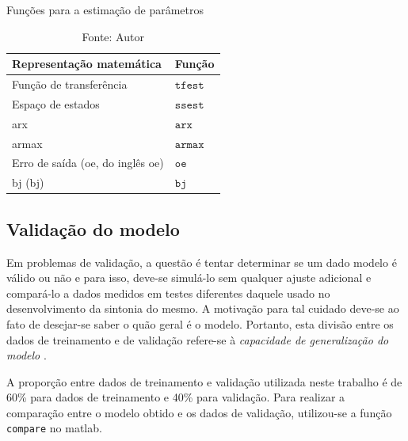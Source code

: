 \begin{table}[h]
	\centering
	\caption{Funções para a estimação de parâmetros}
	\label{tab:param_est_functions}
	\begin{tabular}{ll} \toprule
		{Representação matemática}		                                & {Função}				                    \\ \midrule
		Função de transferência		                                    & $\mathtt{tfest}$                          \\
		Espaço de estados   		                                    & $\mathtt{ssest}$                          \\
		\acrshort{arx}		                                            & $\mathtt{arx}$                            \\
		\acrshort{armax}		                                        & $\mathtt{armax}$                          \\
		Erro de saída (\acrshort{oe}, do inglês \acrlong{oe})		    & $\mathtt{oe}$                             \\
		\acrlong{bj} (\acrshort{bj})             	                    & $\mathtt{bj}$                             \\ \bottomrule
	\end{tabular}
	\caption*{Fonte: Autor}
\end{table}

\subsection{Validação do modelo}
\label{subsec:validacao_do_modelo}

Em problemas de validação, a questão é tentar determinar se um dado modelo é válido ou não e para isso,
deve-se simulá-lo sem qualquer ajuste adicional e compará-lo a dados medidos em testes diferentes daquele
usado no desenvolvimento da sintonia do mesmo. A motivação para tal cuidado deve-se ao fato de desejar-se
saber o quão geral é o modelo. Portanto, esta divisão entre os dados de treinamento e de validação refere-se
à \textit{capacidade de generalização do modelo} \cite{Aguirre2015}.

A proporção entre dados de treinamento e validação utilizada neste trabalho é de 60\% para dados de treinamento
e 40\% para validação. Para realizar a comparação entre o modelo obtido e os dados de validação, utilizou-se
a função \texttt{compare} no \acrshort{matlab}.

